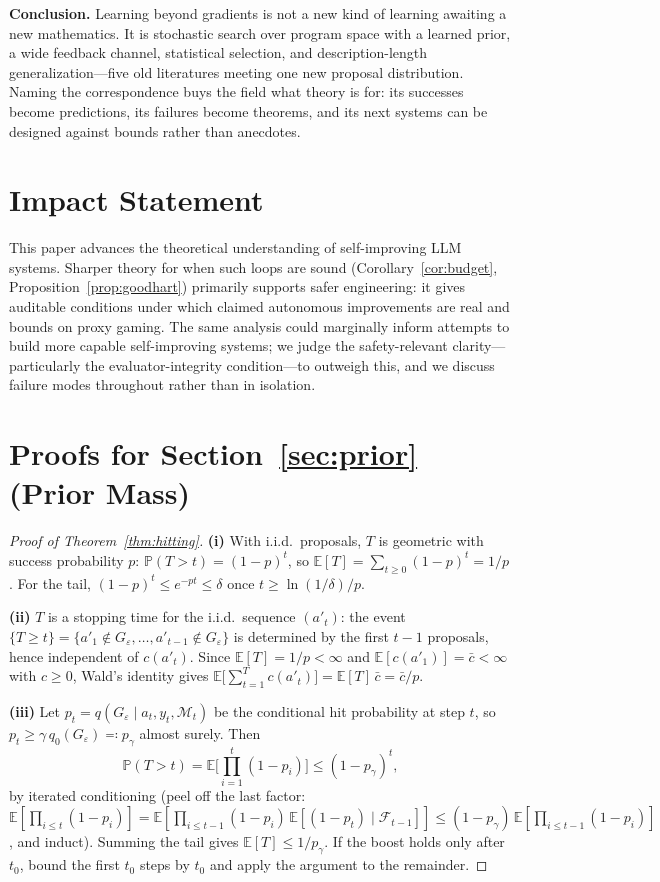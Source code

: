 \documentclass{article}
\theoremstyle{plain}
\theoremstyle{definition}
\theoremstyle{remark}
\newcommand{\M}{\mathcal{M}}
\newcommand{\E}{\mathbb{E}}
\renewcommand{\P}{\mathbb{P}}
\newcommand{\eps}{\varepsilon}
\begin{document}
\textbf{Conclusion.} Learning beyond gradients is not a new kind of learning awaiting a new mathematics. It is stochastic search over program space with a learned prior, a wide feedback channel, statistical selection, and description-length generalization---five old literatures meeting one new proposal distribution. Naming the correspondence buys the field what theory is for: its successes become predictions, its failures become theorems, and its next systems can be designed against bounds rather than anecdotes.

\section*{Impact Statement}
This paper advances the theoretical understanding of self-improving LLM systems. Sharper theory for when such loops are sound (Corollary~\ref{cor:budget}, Proposition~\ref{prop:goodhart}) primarily supports safer engineering: it gives auditable conditions under which claimed autonomous improvements are real and bounds on proxy gaming. The same analysis could marginally inform attempts to build more capable self-improving systems; we judge the safety-relevant clarity---particularly the evaluator-integrity condition---to outweigh this, and we discuss failure modes throughout rather than in isolation.




\newpage
\appendix
\onecolumn

\section{Proofs for Section~\ref{sec:prior} (Prior Mass)}
\label{app:prior}

\begin{proof}[Proof of Theorem~\ref{thm:hitting}]
\textbf{(i)} With i.i.d.\ proposals, $T$ is geometric with success probability $p$: $\P(T > t) = (1-p)^t$, so $\E[T] = \sum_{t \ge 0} (1-p)^t = 1/p$. For the tail, $(1-p)^t \le e^{-pt} \le \delta$ once $t \ge \ln(1/\delta)/p$.

\textbf{(ii)} $T$ is a stopping time for the i.i.d.\ sequence $(a'_t)$: the event $\{T \ge t\} = \{a'_1 \notin G_\eps, \dots, a'_{t-1} \notin G_\eps\}$ is determined by the first $t-1$ proposals, hence independent of $c(a'_t)$. Since $\E[T] = 1/p < \infty$ and $\E[c(a'_1)] = \bar{c} < \infty$ with $c \ge 0$, Wald's identity \cite{wald1944cumulative} gives $\E\big[\sum_{t=1}^{T} c(a'_t)\big] = \E[T]\, \bar{c} = \bar{c}/p$.

\textbf{(iii)} Let $p_t = q(G_\eps \mid a_t, y_t, \M_t)$ be the conditional hit probability at step $t$, so $p_t \ge \gamma\, q_0(G_\eps) \eqqcolon p_\gamma$ almost surely. Then
\[
\P(T > t) = \E\Big[\textstyle\prod_{i=1}^{t} (1 - p_i)\Big] \le (1 - p_\gamma)^t ,
\]
by iterated conditioning (peel off the last factor: $\E[\prod_{i \le t}(1-p_i)] = \E[\prod_{i \le t-1}(1-p_i)\,\E[(1-p_t) \mid \mathcal{F}_{t-1}]] \le (1-p_\gamma)\,\E[\prod_{i \le t-1}(1-p_i)]$, and induct). Summing the tail gives $\E[T] \le 1/p_\gamma$. If the boost holds only after $t_0$, bound the first $t_0$ steps by $t_0$ and apply the argument to the remainder.
\end{proof}
\end{document}
